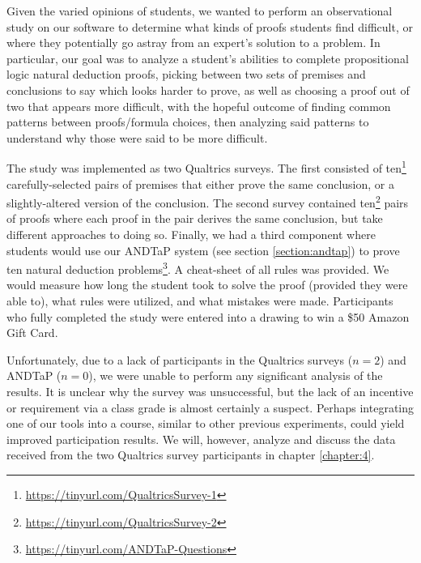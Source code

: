 \documentclass[ms]{uncgdissertationexp2}
\theoremstyle{plain}
\theoremstyle{definition}
\theoremstyle{remark}
\begin{document}
Given the varied opinions of students, we wanted to perform an observational study on our software to determine what kinds of proofs students find difficult, or where they potentially go astray from an expert's solution to a problem. In particular, our goal was to analyze a student's abilities to complete propositional logic natural deduction proofs, picking between two sets of premises and conclusions to say which looks harder to prove, as well as choosing a proof out of two that appears more difficult, with the hopeful outcome of finding common patterns between proofs/formula choices, then analyzing said patterns to understand why those were said to be more difficult.

The study was implemented as two Qualtrics surveys. The first consisted of ten\footnote{\url{https://tinyurl.com/QualtricsSurvey-1}} carefully-selected pairs of premises that either prove the same conclusion, or a slightly-altered version of the conclusion. The second survey contained ten\footnote{\url{https://tinyurl.com/QualtricsSurvey-2}} pairs of proofs where each proof in the pair derives the same conclusion, but take different approaches to doing so. Finally, we had a third component where students would use our ANDTaP system (see section \ref{section:andtap}) to prove ten natural deduction problems\footnote{\url{https://tinyurl.com/ANDTaP-Questions}}. A cheat-sheet of all rules was provided. We would measure how long the student took to solve the proof (provided they were able to), what rules were utilized, and what mistakes were made. Participants who fully completed the study were entered into a drawing to win a \$50 Amazon Gift Card.

Unfortunately, due to a lack of participants in the Qualtrics surveys ($n=2$) and ANDTaP ($n=0$), we were unable to perform any significant analysis of the results. It is unclear why the survey was unsuccessful, but the lack of an incentive or requirement via a class grade is almost certainly a suspect. Perhaps integrating one of our tools into a course, similar to other previous experiments, could yield improved participation results. We will, however, analyze and discuss the data received from the two Qualtrics survey participants in chapter \ref{chapter:4}.
\end{document}
